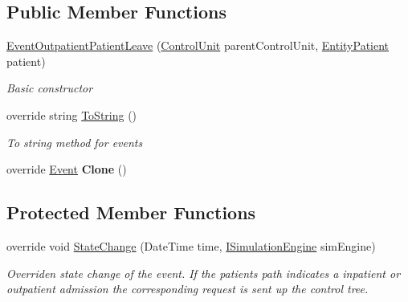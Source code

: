 \subsection*{Public Member Functions}
\begin{DoxyCompactItemize}
\item 
\hyperlink{class_general_health_care_elements_1_1_department_models_1_1_outpatient_1_1_event_outpatient_patient_leave_ab35c3aa9d1ac875c3b699e3b24efa0a3}{Event\+Outpatient\+Patient\+Leave} (\hyperlink{class_simulation_core_1_1_h_c_c_m_elements_1_1_control_unit}{Control\+Unit} parent\+Control\+Unit, \hyperlink{class_general_health_care_elements_1_1_entities_1_1_entity_patient}{Entity\+Patient} patient)
\begin{DoxyCompactList}\small\item\em Basic constructor \end{DoxyCompactList}\item 
override string \hyperlink{class_general_health_care_elements_1_1_department_models_1_1_outpatient_1_1_event_outpatient_patient_leave_aa1fe02e30837e14823abc3e2232fff3e}{To\+String} ()
\begin{DoxyCompactList}\small\item\em To string method for events \end{DoxyCompactList}\item 
override \hyperlink{class_simulation_core_1_1_h_c_c_m_elements_1_1_event}{Event} {\bfseries Clone} ()\hypertarget{class_general_health_care_elements_1_1_department_models_1_1_outpatient_1_1_event_outpatient_patient_leave_a575261860c94d5cdd2e5b43d42a040e8}{}\label{class_general_health_care_elements_1_1_department_models_1_1_outpatient_1_1_event_outpatient_patient_leave_a575261860c94d5cdd2e5b43d42a040e8}

\end{DoxyCompactItemize}
\subsection*{Protected Member Functions}
\begin{DoxyCompactItemize}
\item 
override void \hyperlink{class_general_health_care_elements_1_1_department_models_1_1_outpatient_1_1_event_outpatient_patient_leave_a52a87c518ca8aa8b755fda556462b8d6}{State\+Change} (Date\+Time time, \hyperlink{interface_simulation_core_1_1_simulation_classes_1_1_i_simulation_engine}{I\+Simulation\+Engine} sim\+Engine)
\begin{DoxyCompactList}\small\item\em Overriden state change of the event. If the patient\textquotesingle{}s path indicates a inpatient or outpatient admission the corresponding request is sent up the control tree. \end{DoxyCompactList}\end{DoxyCompactItemize}
